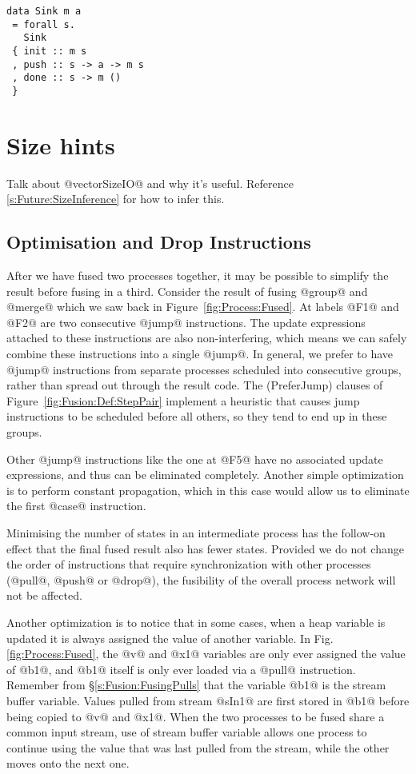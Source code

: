 \begin{lstlisting}
data Sink m a
 = forall s.
   Sink
 { init :: m s
 , push :: s -> a -> m s
 , done :: s -> m ()
 }
\end{lstlisting}

\section{Size hints}
\label{s:implementation:sizehints}
Talk about @vectorSizeIO@ and why it's useful.
Reference \autoref{s:Future:SizeInference} for how to infer this.

\subsection{Optimisation and Drop Instructions}
\label{s:Optimisation}
After we have fused two processes together, it may be possible to simplify the result before fusing in a third. Consider the result of fusing @group@ and @merge@ which we saw back in Figure~\ref{fig:Process:Fused}. At labels @F1@ and @F2@ are two consecutive @jump@ instructions.
The update expressions attached to these instructions are also non-interfering, which means we can safely combine these instructions into a single @jump@.
In general, we prefer to have @jump@ instructions from separate processes scheduled into consecutive groups, rather than spread out through the result code.
The (PreferJump) clauses of Figure~\ref{fig:Fusion:Def:StepPair} implement a heuristic that causes jump instructions to be scheduled before all others, so they tend to end up in these groups.

Other @jump@ instructions like the one at @F5@ have no associated update expressions, and thus can be eliminated completely. Another simple optimization is to perform constant propagation, which in this case would allow us to eliminate the first @case@ instruction. 

Minimising the number of states in an intermediate process has the follow-on effect that the final fused result also has fewer states. Provided we do not change the order of instructions that require synchronization with other processes (@pull@, @push@ or @drop@), the fusibility of the overall process network will not be affected.

Another optimization is to notice that in some cases, when a heap variable is updated it is always assigned the value of another variable. In Fig.\ref{fig:Process:Fused}, the @v@ and @x1@ variables are only ever assigned the value of @b1@, and @b1@ itself is only ever loaded via a @pull@ instruction. Remember from \S\ref{s:Fusion:FusingPulls} that the variable @b1@ is the stream buffer variable. Values pulled from stream @sIn1@ are first stored in @b1@ before being copied to @v@ and @x1@. When the two processes to be fused share a common input stream, use of stream buffer variable allows one process to continue using the value that was last pulled from the stream, while the other moves onto the next one. 


